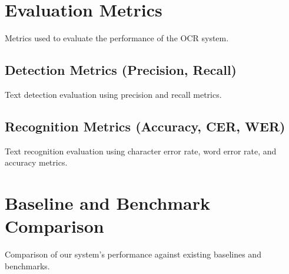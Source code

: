 \section{Evaluation Metrics}
\label{sec:metrics}
Metrics used to evaluate the performance of the OCR system.

\subsection{Detection Metrics (Precision, Recall)}
\label{subsec:detection-metrics}
Text detection evaluation using precision and recall metrics.

\subsection{Recognition Metrics (Accuracy, CER, WER)}
\label{subsec:recognition-metrics}
Text recognition evaluation using character error rate, word error rate, and accuracy metrics.

\section{Baseline and Benchmark Comparison}
\label{sec:benchmark}
Comparison of our system's performance against existing baselines and benchmarks.
